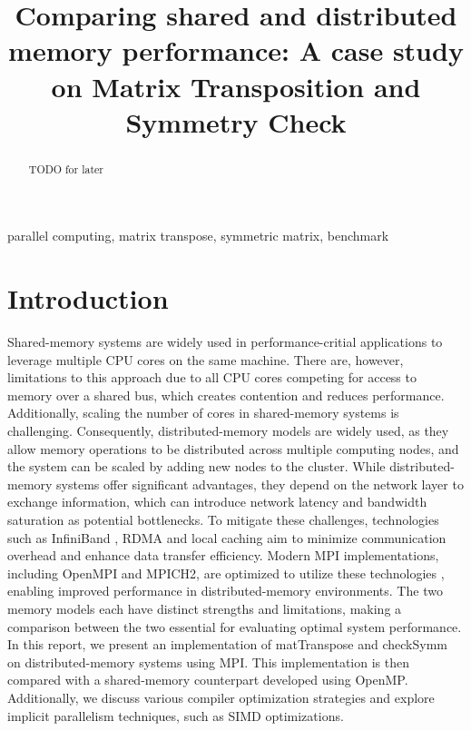 \documentclass[conference]{IEEEtran}
\begin{document}
\title{Comparing shared and distributed memory performance: A case study on Matrix Transposition and Symmetry Check\\
}

\author{
}

\maketitle

\begin{abstract}
TODO for later \end{abstract}

\begin{IEEEkeywords}
parallel computing, matrix transpose, symmetric matrix, benchmark
\end{IEEEkeywords}

\section{Introduction}

Shared-memory systems are widely used in performance-critial applications
to leverage multiple CPU cores on the same machine.
There are, however, limitations to this approach due to all CPU cores
competing for access to memory over a shared bus, which creates contention
and reduces performance. Additionally, scaling the number of cores in
shared-memory systems is challenging. Consequently, distributed-memory
models are widely used, as they allow memory operations to be
distributed across multiple computing nodes, and the system can
be scaled by adding new nodes to the cluster. While distributed-memory
systems offer significant advantages, they
depend on the network layer to exchange information, which can
introduce network latency and bandwidth saturation as potential
bottlenecks. To mitigate these challenges, technologies such as
InfiniBand \cite{b0}, RDMA \cite{b-1} and local caching \cite{b-2}
aim to minimize communication overhead and
enhance data transfer efficiency. Modern MPI implementations,
including OpenMPI and MPICH2, are optimized to utilize these
technologies \cite{b1} \cite{b2}, enabling improved performance in
distributed-memory environments. The two memory models each
have distinct strengths and limitations,
making a comparison between the two essential for evaluating optimal
system performance. In this report, we present an implementation of
matTranspose and checkSymm on distributed-memory systems using MPI.
This implementation is then compared with a shared-memory counterpart
developed using OpenMP. Additionally, we discuss various compiler
optimization strategies and explore implicit parallelism techniques,
such as SIMD optimizations.
\end{document}
